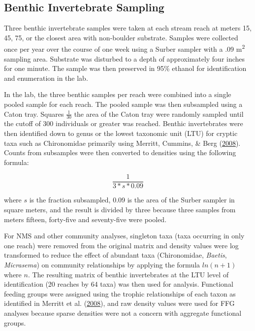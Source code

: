 \documentclass[double,12pt]{beavtex}
\begin{document}
  \subsection*{Benthic Invertebrate
  Sampling}\label{benthic-invertebrate-sampling}
  
  Three benthic invertebrate samples were taken at each stream reach at
  meters 15, 45, 75, or the closest area with non-boulder substrate.
  Samples were collected once per year over the course of one week using a
  Surber sampler with a .09 m\textsuperscript{2} sampling area. Substrate
  was disturbed to a depth of approximately four inches for one minute.
  The sample was then preserved in 95\% ethanol for identification and
  enumeration in the lab.
  
  In the lab, the three benthic samples per reach were combined into a
  single pooled sample for each reach. The pooled sample was then
  subsampled using a Caton tray. Squares \(\frac{1} {30}\) the area of the
  Caton tray were randomly sampled until the cutoff of 300 individuals or
  greater was reached. Benthic invertebrates were then identified down to
  genus or the lowest taxonomic unit (LTU) for cryptic taxa such as
  Chironomidae primarily using Merritt, Cummins, \& Berg
  (\protect\hyperlink{ref-Merritt2008}{2008}). Counts from subsamples were
  then converted to densities using the following formula:
  
  \begin{equation}
  \frac{1}{3*s*0.09}
  \end{equation}
  
  where \(s\) is the fraction subsampled, 0.09 is the area of the Surber
  sampler in square meters, and the result is divided by three because
  three samples from meters fifteen, forty-five and seventy-five were
  pooled.
  
  For NMS and other community analyses, singleton taxa (taxa occurring in
  only one reach) were removed from the original matrix and density values
  were log transformed to reduce the effect of abundant taxa
  (Chironomidae, \emph{Baetis}, \emph{Micrasema}) on community
  relationships by applying the formula \(ln(n + 1)\) where \(n\). The
  resulting matrix of benthic invertebrates at the LTU level of
  identification (20 reaches by 64 taxa) was then used for analysis.
  Functional feeding groups were assigned using the trophic relationships
  of each taxon as identified in Merritt et al.
  (\protect\hyperlink{ref-Merritt2008}{2008}), and raw density values were
  used for FFG analyses because sparse densities were not a concern with
  aggregate functional groups.
  
\end{document}
